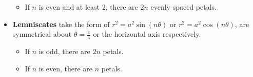 \documentclass[../AP_Calculus]{subfiles}
\begin{document}
\begin{itemize}
\begin{itemize}
							\begin{center}
							\end{center}
						\item If $n$ is even and at least 2, there are $2n$ evenly spaced petals.
							\begin{center}
							\end{center}
					\end{itemize}
				\item \textbf{Lemniscates} take the form of $r^2 = a^2\sin(n\theta)$ or $r^2 = a^2\cos(n\theta)$, are symmetrical about $\theta = \frac{\pi}{4}$ or the horizontal axis respectively.
					\begin{itemize}
						\item If $n$ is odd, there are $2n$ petals.
							\begin{center}
							\end{center}
						\item If $n$ is even, there are $n$ petals.
							\begin{center}
							\end{center}
					\end{itemize}
			\end{itemize}
\end{document}
